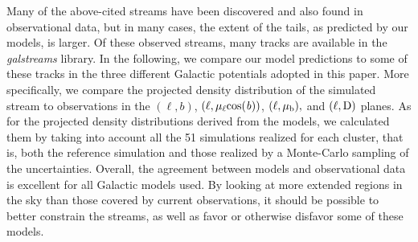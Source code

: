             Many of the above-cited streams have been discovered and also found  in observational data, but in many cases, the extent of the tails, as predicted by our models, is larger. Of these observed streams, many tracks are available in the \textit{galstreams} \citep{mateu22} library. In the following, we compare our model predictions to some of these tracks in the three different Galactic potentials adopted in this paper. More specifically, we compare the projected density distribution of the simulated stream to observations in the $(\ell, b)$, $(\ell,  \rm \mu_{\ell}cos(\mathit{b}))$, $(\ell, \rm \mu_b),$ and $(\ell, \rm D)$ planes. As for the projected density distributions derived from the models, we calculated them by taking into account all the 51 simulations realized for each cluster, that is, both the reference simulation and those realized by a Monte-Carlo sampling of the uncertainties. Overall, the agreement between models and observational data is excellent for all Galactic models used. By looking at more extended regions in the sky than those covered by current observations, it should be possible to better constrain the streams, as well as favor or otherwise disfavor some of these models.

